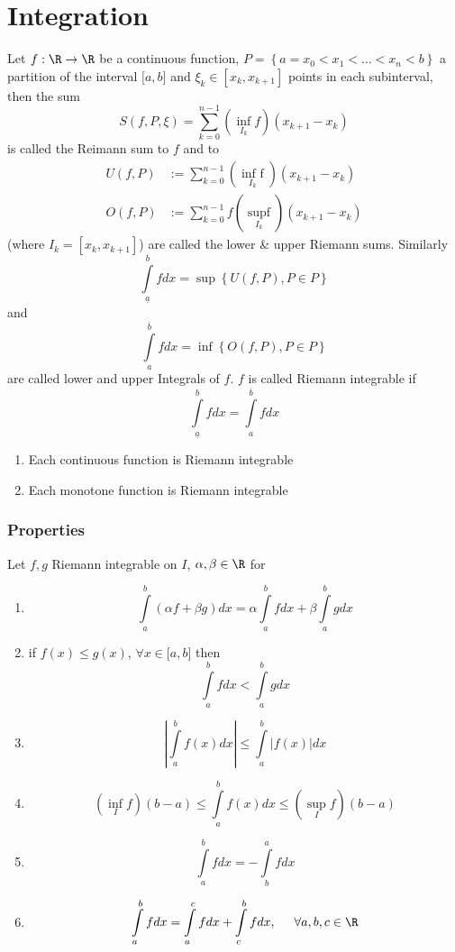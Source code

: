 \documentclass[a4paper]{article}
\begin{document}
\section{Integration}
Let $f:\R\to\R$ be a continuous function, $P=\left\{ a=x_0<x_1<\dots <x_n<b\right\}$ a partition of the interval $\lbrack a,b\rbrack$ and $\xi_k\in\left[ x_k,x_{k+1}\right]$ points in each subinterval, then the sum 
\[S\left( {f,P,\xi } \right) = \sum\limits_{k = 0}^{n - 1} {\left( {\mathop {\inf }\limits_{{I_k}} f} \right)\left( {{x_{k + 1}} - {x_k}} \right)} \]
is called the Reimann sum  to $f$ and to 
\begin{align*}
U(f,P)&:=\sum\limits_{k = 0}^{n-1} {(\mathop {{\text{inf }}f}\limits_{I_k} )} ({x_{k+1}} - {x_{k}})\\
O(f,P)&:=\sum\limits_{k = 0}^{n-1} {f(\mathop {{\text{sup}}f}\limits_{I_k} )} ({x_{k+1}} - {x_{k}})
\end{align*}
(where $I_k=\left[x_k,x_{k+1}\right]$) are called the lower \& upper Riemann sums. Similarly
\[\int\limits_{\underline{a}}^{b} {fdx = \sup\left\{ {U\left( {f,P} \right),P \in P} \right\}} \] 
and
\[\int\limits_a^{\overline{b}} {fdx = \inf \left\{ {O\left( {f,P} \right),P \in P} \right\}} \]
are called lower and upper Integrals of $f$. $f$ is called Riemann integrable if 
\[\int\limits_{\underline{a}}^b {fdx = } \int\limits_a^{\overline{b}} {fdx} \]
\begin{fact}{}
\begin{enumerate}
\item Each continuous function is Riemann integrable
\item Each monotone function is Riemann integrable
\end{enumerate}
\end{fact}
\subsubsection*{Properties}
Let $f,g$ Riemann integrable on $I$, $\alpha,\beta\in\R$ for
\begin{enumerate}
\item \[\int\limits_a^b {\left( {\alpha f + \beta g} \right)dx}  = \alpha \int\limits_a^b {fdx}  + \beta \int\limits_a^b {gdx} \]
\item if $f(x)\leq g(x)$, $\forall x\in\lbrack a,b\rbrack$ then \[\int\limits_a^b {fdx}  < \int\limits_a^b {gdx} \]
\item \[\left| {\int\limits_a^b {f(x)dx} } \right| \le \int\limits_a^b {\left| {f(x)} \right|dx} \]
\item \[\left( {\mathop {\inf }\limits_I f} \right)\left( {b - a} \right) \le \int\limits_a^b {f(x)dx}  \le \left( {\mathop {\sup }\limits_I f} \right)\left( {b - a} \right)\]
\item \[\int\limits_a^b {fdx}  =  - \int\limits_b^a {fdx} \]
\item \[\int\limits_a^b {fdx}  = \int\limits_a^c {fdx}  + \int\limits_c^b {fdx},\hspace{5mm}\forall a,b,c\in\R \]
\end{enumerate}
\end{document}
